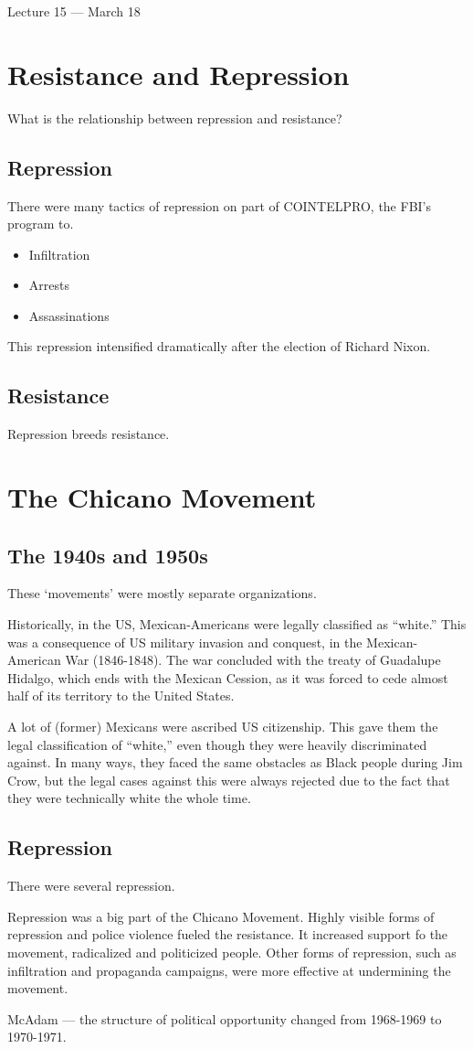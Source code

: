 \vspace{3mm}
\noindent Lecture 15 --- March 18\th

\section{Resistance and Repression}
What is the relationship between repression and resistance?

\subsection{Repression}
There were many tactics of repression on part of COINTELPRO, the FBI's program to.
\begin{itemize}
    \item Infiltration
    \item Arrests
    \item Assassinations
\end{itemize}
This repression intensified dramatically after the election of Richard Nixon.

\subsection{Resistance}
Repression breeds resistance.

\section{The Chicano Movement}

\subsection{The 1940s and 1950s}
These `movements' were mostly separate organizations.


Historically, in the US, Mexican-Americans were legally classified as ``white.''
This was a consequence of US military invasion and conquest, in the Mexican-American War (1846-1848).
The war concluded with the treaty of Guadalupe Hidalgo, which ends with the Mexican Cession, as it was forced to cede almost half of its territory to the United States.

A lot of (former) Mexicans were ascribed US citizenship.
This gave them the legal classification of ``white,'' even though they were heavily discriminated against.
In many ways, they faced the same obstacles as Black people during Jim Crow, but the legal cases against this were always rejected due to the fact that they were technically white the whole time.

\subsection{Repression}
There were several repression.

Repression was a big part of the Chicano Movement.
Highly visible forms of repression and police violence fueled the resistance.
It increased support fo the movement, radicalized and politicized people.
Other forms of repression, such as infiltration and propaganda campaigns, were more effective at undermining the movement.

McAdam --- the structure of political opportunity changed from 1968-1969 to 1970-1971.